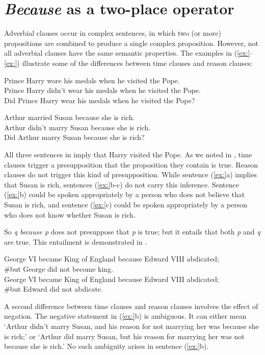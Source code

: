 \section{\textit{Because} as a two-place operator}\label{sec:18.2}

Adverbial clauses occur in complex sentences, in which two (or more) propositions are combined to produce a single complex proposition. However, not all adverbial clauses have the same semantic properties. The examples in (\ref{ex:}--\ref{ex:}) illustrate some of the differences between time clauses and reason clauses:


\ea
\ea Prince Harry wore his medals when he visited the Pope.\\
\ex Prince Harry didn’t wear his medals when he visited the Pope.\\
\ex Did Prince Harry wear his medals when he visited the Pope?
                       \z
\z

\ea
\ea Arthur married Susan because she is rich.\\
\ex Arthur didn’t marry Susan because she is rich.\\
\ex Did Arthur marry Susan because she is rich?
                       \z
\z


All three sentences in  imply that Harry visited the Pope. As we noted in , time clauses trigger a presupposition that the proposition they contain is true. Reason clauses do not trigger this kind of presupposition. While sentence (\ref{ex:}a) implies that Susan is rich, sentences (\ref{ex:}b-c) do not carry this inference. Sentence (\ref{ex:}b) could be spoken appropriately by a person who does not believe that Susan is rich, and sentence (\ref{ex:}c) could be spoken appropriately by a person who does not know whether Susan is rich.



So \textit{q because p} does not presuppose that \textit{p} is true; but it entails that both \textit{p} and \textit{q} are true. This entailment is demonstrated in .


\ea
\ea George VI became King of England because Edward VIII abdicated;\\
  \#but George did not become king.\\
\ex George VI became King of England because Edward VIII abdicated;\\
  \#but Edward did not abdicate.
                       \z
\z


A second difference between time clauses and reason clauses involves the effect of negation. The negative statement in (\ref{ex:}b) is ambiguous. It can either mean ‘Arthur didn’t marry Susan, and his reason for not marrying her was because she is rich;’ or ‘Arthur did marry Susan, but his reason for marrying her was not because she is rich.’ No such ambiguity arises in sentence (\ref{ex:}b).



